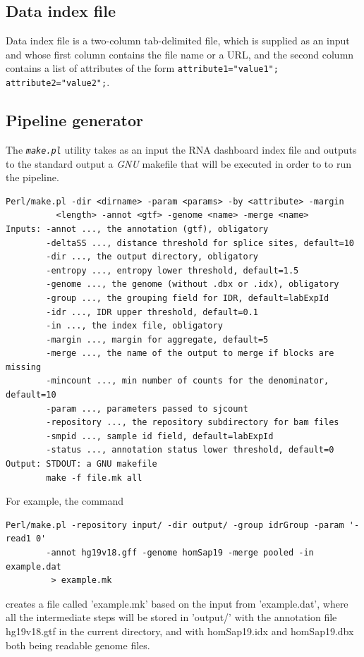 \documentclass{article}
\newcommand{\prog}[1]{{\tt\em #1}}
\begin{document}
\subsection{Data index file}
Data index file is a two-column tab-delimited file, which is supplied as an input and  whose first column contains the file name or a URL, 
and the second column contains a list of attributes of the form {\tt attribute1="value1"; attribute2="value2";}. 

\subsection{Pipeline generator}
The \prog{make.pl} utility takes as an input the RNA dashboard index file and outputs to the standard output a {\em GNU} makefile that 
will be executed in order to to run the pipeline.
\begin{verbatim} 
Perl/make.pl -dir <dirname> -param <params> -by <attribute> -margin 
          <length> -annot <gtf> -genome <name> -merge <name>
Inputs: -annot ..., the annotation (gtf), obligatory
        -deltaSS ..., distance threshold for splice sites, default=10
        -dir ..., the output directory, obligatory
        -entropy ..., entropy lower threshold, default=1.5
        -genome ..., the genome (without .dbx or .idx), obligatory
        -group ..., the grouping field for IDR, default=labExpId
        -idr ..., IDR upper threshold, default=0.1
        -in ..., the index file, obligatory
        -margin ..., margin for aggregate, default=5
        -merge ..., the name of the output to merge if blocks are missing
        -mincount ..., min number of counts for the denominator, default=10
        -param ..., parameters passed to sjcount
        -repository ..., the repository subdirectory for bam files
        -smpid ..., sample id field, default=labExpId
        -status ..., annotation status lower threshold, default=0
Output: STDOUT: a GNU makefile
        make -f file.mk all
\end{verbatim} 

For example, the command
\begin{verbatim}
Perl/make.pl -repository input/ -dir output/ -group idrGroup -param '-read1 0' 
        -annot hg19v18.gff -genome homSap19 -merge pooled -in example.dat 
         > example.mk
\end{verbatim}
creates a file called 'example.mk' based on the input from 'example.dat', where all the intermediate steps will be stored in 'output/' 
with the annotation file hg19v18.gtf in the current directory, and with homSap19.idx and homSap19.dbx both being readable genome files.
\end{document}
